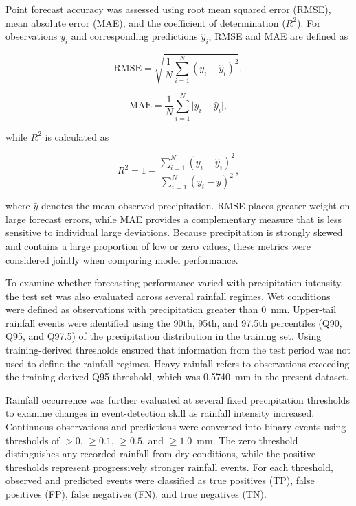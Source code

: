 \documentclass[referee,pdflatex,sn-basic]{sn-jnl}%
\theoremstyle{thmstyleone}%
\theoremstyle{thmstyletwo}%
\theoremstyle{thmstylethree}%
\begin{document}
Point forecast accuracy was assessed using root mean squared error (RMSE), mean absolute error (MAE), and the coefficient of determination ($R^2$). For observations $y_i$ and corresponding predictions $\hat{y}_i$, RMSE and MAE are defined as

\begin{equation}
\mathrm{RMSE}
=
\sqrt{
\frac{1}{N}
\sum_{i=1}^{N}
\left(y_i-\hat{y}_i\right)^2
},
\label{eq:rmse}
\end{equation}

\begin{equation}
\mathrm{MAE}
=
\frac{1}{N}
\sum_{i=1}^{N}
\lvert y_i-\hat{y}_i\rvert,
\label{eq:mae}
\end{equation}

while $R^2$ is calculated as

\begin{equation}
R^2
=
1-
\frac{
\sum_{i=1}^{N}
\left(
y_i-\hat{y}_i
\right)^2
}{
\sum_{i=1}^{N}
\left(
y_i-\bar{y}
\right)^2
},
\label{eq:r2}
\end{equation}

where $\bar{y}$ denotes the mean observed precipitation. RMSE places greater weight on large forecast errors, while MAE provides a complementary measure that is less sensitive to individual large deviations. Because precipitation is strongly skewed and contains a large proportion of low or zero values, these metrics were considered jointly when comparing model performance.

To examine whether forecasting performance varied with precipitation intensity, the test set was also evaluated across several rainfall regimes. Wet conditions were defined as observations with precipitation greater than 0~mm. Upper-tail rainfall events were identified using the 90th, 95th, and 97.5th percentiles (Q90, Q95, and Q97.5) of the precipitation distribution in the training set. Using training-derived thresholds ensured that information from the test period was not used to define the rainfall regimes. Heavy rainfall refers to observations exceeding the training-derived Q95 threshold, which was 0.5740~mm in the present dataset.

Rainfall occurrence was further evaluated at several fixed precipitation thresholds to examine changes in event-detection skill as rainfall intensity increased. Continuous observations and predictions were converted into binary events using thresholds of $>0$, $\geq0.1$, $\geq0.5$, and $\geq1.0$~mm. The zero threshold distinguishes any recorded rainfall from dry conditions, while the positive thresholds represent progressively stronger rainfall events. For each threshold, observed and predicted events were classified as true positives (TP), false positives (FP), false negatives (FN), and true negatives (TN).
\end{document}
